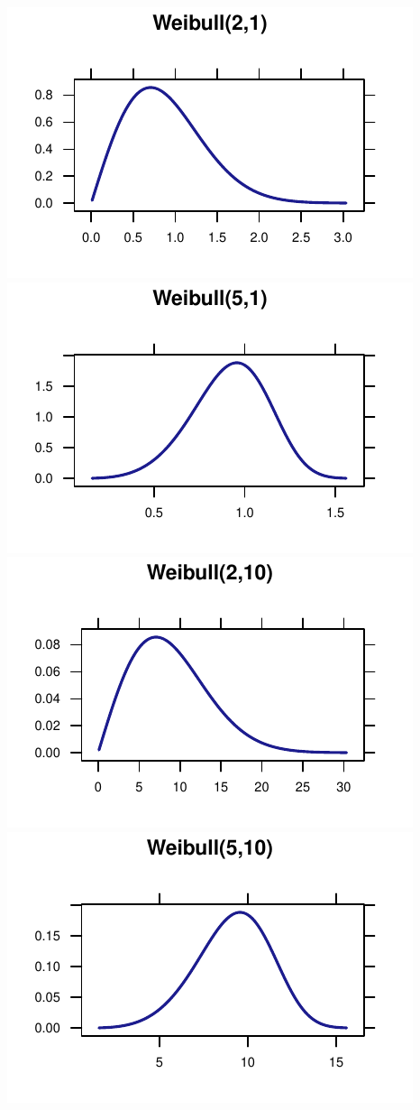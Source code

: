 \documentclass[twoside]{book}\usepackage[]{graphicx}\usepackage[]{xcolor}
\makeatletter
\def\maxwidth{ %
  \ifdim\Gin@nat@width>\linewidth
    \linewidth
  \else
    \Gin@nat@width
  \fi
}
\newenvironment{knitrout}{}{} %
\makeatother
\begin{document}
\begin{knitrout}
{\centering \includegraphics[width=\maxwidth]{figures/fig-unnamed-chunk-83-1} 
\includegraphics[width=\maxwidth]{figures/fig-unnamed-chunk-83-2} 
\includegraphics[width=\maxwidth]{figures/fig-unnamed-chunk-83-3} 
\includegraphics[width=\maxwidth]{figures/fig-unnamed-chunk-83-4} 

}
\end{knitrout}
\end{document}
